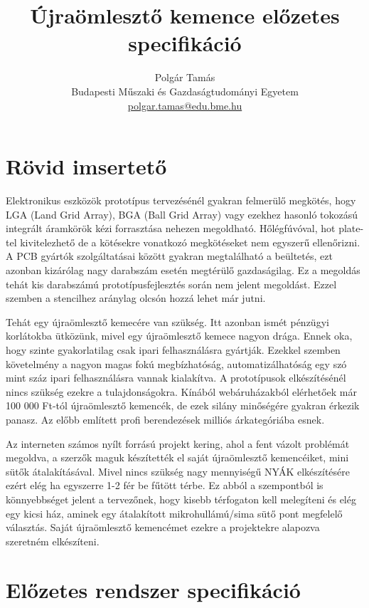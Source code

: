 \documentclass[11pt]{article} %
\title{Újraömlesztő kemence előzetes specifikáció}
\author{Polgár Tamás \\ Budapesti Műszaki és Gazdaságtudományi Egyetem \\ \href{mailto:polgar.tamas@edu.bme.hu}{polgar.tamas@edu.bme.hu} }
\begin{document}
\maketitle

\section{Rövid imsertető}
Elektronikus eszközök prototípus tervezésénél gyakran felmerülő megkötés, hogy LGA (Land Grid Array), BGA (Ball Grid Array) vagy ezekhez hasonló tokozású integrált áramkörök kézi forrasztása nehezen megoldható. Hőlégfúvóval, hot plate-tel kivitelezhető de a kötésekre vonatkozó megkötéseket nem egyszerű ellenőrizni. A PCB gyártók szolgáltatásai között gyakran megtalálható a beültetés, ezt azonban kizárólag nagy darabszám esetén megtérülő gazdaságilag. Ez a megoldás tehát kis darabszámú prototípusfejlesztés során nem jelent megoldást. Ezzel szemben a stencilhez aránylag olcsón hozzá lehet már jutni.

Tehát egy újraömlesztő kemecére van szükség. Itt azonban ismét pénzügyi korlátokba ütközünk, mivel egy újraömlesztő kemece nagyon drága. Ennek oka, hogy szinte gyakorlatilag csak ipari felhasználásra gyártják. Ezekkel szemben követelmény a nagyon magas fokú megbízhatóság, automatizálhatóság egy szó mint száz ipari felhasználásra vannak kialakítva. A prototípusok elkészítésénél nincs szükség ezekre a tulajdonságokra. Kínából webáruházakból elérhetőek már 100 000 Ft-tól újraömlesztő kemencék, de ezek silány minőségére gyakran érkezik panasz. Az előbb említett profi berendezések milliós árkategóriába esnek.

Az interneten számos nyílt forrású projekt kering, ahol a fent vázolt problémát megoldva, a szerzők maguk készítették el saját újraömlesztő kemencéiket, mini sütők átalakításával. Mivel nincs szükség nagy mennyiségű NYÁK elkészítésére ezért elég ha egyszerre 1-2 fér be fűtött térbe. Ez abból a szempontból is könnyebbséget jelent a tervezőnek, hogy kisebb térfogaton kell melegíteni és elég egy kicsi ház, aminek egy átalakított mikrohullámú/sima sütő pont megfelelő választás. Saját újraömlesztő kemencémet ezekre a projektekre alapozva szeretném elkészíteni.

\newpage

\section{Előzetes rendszer specifikáció}
\end{document}
